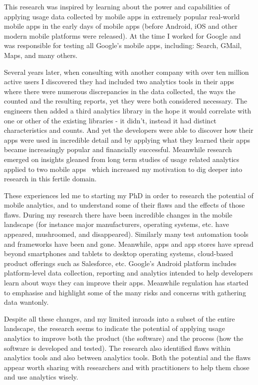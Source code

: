 This research was inspired by learning about the power and capabilities of applying usage data collected by mobile apps in extremely popular real-world mobile apps in the early days of mobile apps (before Android, iOS and other modern mobile platforms were released). At the time I worked for Google and was responsible for testing all Google's mobile apps, including: Search, GMail, Maps, and many others.

Several years later, when consulting with another company with over ten million active users I discovered they had included two analytics tools in their apps where there were numerous discrepancies in the data collected, the ways the counted and the resulting reports, yet they were both considered necessary. The engineers then added a third analytics library in the hope it would correlate with one or other of the existing libraries - it didn't, instead it had distinct characteristics and counts. And yet the developers were able to discover how their apps were used in incredible detail and by applying what they learned their apps became increasingly popular and financially successful. Meanwhile research emerged on insights gleaned from long term studies of usage related analytics applied to two mobile apps~\citep{patro2013_capturing_mobile_experience_in_the_wild} which increased my motivation to dig deeper into research in this fertile domain.

These experiences led me to starting my PhD in order to research the potential of mobile analytics, and to understand some of their flaws and the effects of those flaws. During my research there have been incredible changes in the mobile landscape (for instance major manufacturers, operating systems, etc. have appeared, mushroomed, and disappeared). Similarly many test automation tools and frameworks have been and gone. Meanwhile, apps and app stores have spread beyond smartphones and tablets to desktop operating systems, cloud-based product offerings such as Salesforce, etc. Google's Android platform includes platform-level data collection, reporting and analytics intended to help developers learn about ways they can improve their apps. Meanwhile regulation has started to emphasise and highlight some of the many risks and concerns with gathering data wantonly. 

Despite all these changes, and my limited inroads into a subset of the entire landscape, the research seems to indicate the potential of applying usage analytics to improve both the product (the software) and the process (how the software is developed and tested). The research also identified flaws within analytics tools and also between analytics tools. Both the potential and the flaws appear worth sharing with researchers and with practitioners to help them chose and use analytics wisely.


